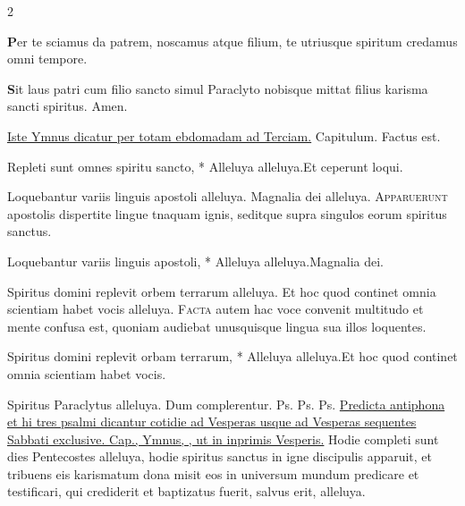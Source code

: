 \begin{multicols*}{2}
{\par {\bfseries \color{Blue} P}er te sciamus da patrem,
noscamus atque filium,
te utriusque spiritum
credamus omni tempore.
\par {\bfseries \color{Red} S}it laus patri cum filio
sancto simul Paraclyto
nobisque mittat filius
karisma sancti spiritus. Amen.
}
\newline \ul{Iste Ymnus dicatur per totam ebdomadam ad Terciam.} {\color{Red} Capitulum.} Factus est.
\begin{responsory-breve}
{Repleti sunt omnes spiritu sancto, * Alleluya alleluya.}{Et ceperunt loqui.}
\end{responsory-breve}%
\newline \V Loquebantur variis linguis apostoli alleluya. \R Magnalia dei alleluya.
\lettrine[lines=2]{\zallmancaps \color{Red} A}{pparuerunt} apostolis dispertite lingue tnaquam ignis, seditque supra singulos eorum spiritus sanctus.
\begin{responsory-breve}
{Loquebantur variis linguis apostoli, * Alleluya alleluya.}{Magnalia dei.}
\end{responsory-breve}%
\newline \V Spiritus domini replevit orbem terrarum alleluya. \R Et hoc quod continet omnia scientiam habet vocis alleluya.
\lettrine[lines=2]{\zallmancaps \color{Blue} F}{acta} autem hac voce convenit multitudo et mente confusa est, quoniam audiebat unusquisque lingua sua illos loquentes.
\begin{responsory-breve}
{Spiritus domini replevit orbam terrarum, * Alleluya alleluya.}{Et hoc quod continet omnia scientiam habet vocis.}
\end{responsory-breve}%
\newline \V Spiritus Paraclytus alleluya. 
 Dum complerentur. {\color{Red} Ps.}  {\color{Red} Ps.}  {\color{Red} Ps.} 
\newline \ul{Predicta antiphona et hi tres psalmi dicantur cotidie ad Vesperas usque ad Vesperas sequentes Sabbati exclusive. Cap., Ymnus, \Vbar , ut in inprimis Vesperis.}
  Hodie completi sunt dies Pentecostes alleluya, hodie spiritus sanctus in igne discipulis apparuit, et tribuens eis karismatum dona misit eos in universum mundum predicare et testificari, qui crediderit et baptizatus fuerit, salvus erit, alleluya.

\end{multicols*}

